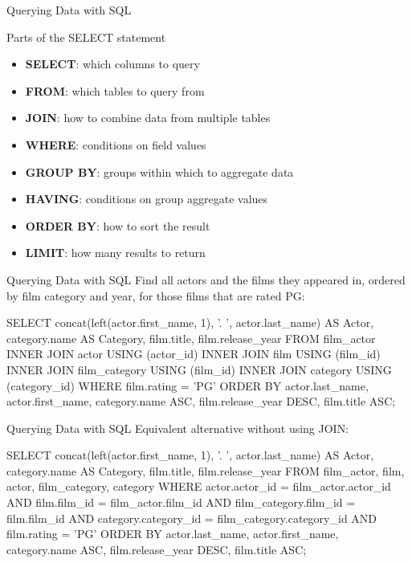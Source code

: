 \documentclass[ignorenonframetext,xcolor=x11names]{beamer}
\begin{document}
\begin{frame}{Querying Data with SQL}
\begin{block}{Parts of the SELECT statement}
  \begin{itemize}
     \item \textbf{SELECT}: which columns to query
     \item \textbf{FROM}: which tables to query from
     \item \textbf{JOIN}: how to combine data from multiple tables
     \item \textbf{WHERE}: conditions on field values
     \item \textbf{GROUP BY}: groups within which to aggregate data
     \item \textbf{HAVING}: conditions on group aggregate values
     \item \textbf{ORDER BY}: how to sort the result
     \item \textbf{LIMIT}: how many results to return
   \end{itemize}
\end{block}
\end{frame}

\begin{frame}[fragile]{Querying Data with SQL}
Find all actors and the films they appeared in, ordered by film category and year, for those films that are rated PG:
\footnotesize
\begin{sqlcode}
SELECT concat(left(actor.first_name, 1), 
              '. ', actor.last_name) AS Actor, 
       category.name AS Category, 
       film.title, 
       film.release_year
  FROM film_actor
  INNER JOIN actor USING (actor_id)
  INNER JOIN film USING (film_id)
  INNER JOIN film_category USING (film_id)
  INNER JOIN category USING (category_id)
  WHERE film.rating = 'PG'
  ORDER BY actor.last_name, 
           actor.first_name, 
           category.name ASC, 
           film.release_year DESC, 
           film.title ASC;
\end{sqlcode}
\end{frame}

\begin{frame}[fragile]{Querying Data with SQL}
Equivalent alternative without using JOIN:
\footnotesize
\begin{sqlcode}
SELECT concat(left(actor.first_name, 1), 
              '. ', actor.last_name) AS Actor, 
       category.name AS Category, 
       film.title, 
       film.release_year
  FROM film_actor, film, actor, film_category, category
  WHERE actor.actor_id = film_actor.actor_id AND
        film.film_id = film_actor.film_id AND
        film_category.film_id = film.film_id AND
        category.category_id = 
            film_category.category_id AND
        film.rating = 'PG'
  ORDER BY actor.last_name, 
           actor.first_name, 
           category.name ASC, 
           film.release_year DESC, 
           film.title ASC;
\end{sqlcode}
\end{frame}
\end{document}
